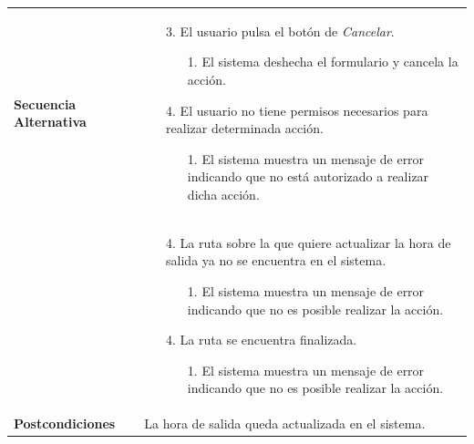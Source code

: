 \begin{longtable}{| p{4cm} | p{10cm} |}
\\
\hline
\textbf{Secuencia Alternativa} &\mbox{}\par\vspace{-\baselineskip}
\begin{enumerate}[leftmargin=0.7cm, topsep=0.1cm]
\item[3.] El usuario pulsa el botón de \textit{Cancelar}.
	\begin{itemize}
	\item[1.] El sistema deshecha el formulario y cancela la acción.
	\end{itemize}
\item[4.] El usuario no tiene permisos necesarios para realizar determinada acción.
	\begin{itemize}
	\item[1.] El sistema muestra un mensaje de error indicando que no está autorizado a realizar dicha acción.
	\end{itemize}
\end{enumerate}
\\ &\mbox{}\par\vspace{-\baselineskip}	
\begin{enumerate}[leftmargin=0.7cm, topsep=0.1cm]
\item[4.] La ruta sobre la que quiere actualizar la hora de salida ya no se encuentra en el sistema.
	\begin{itemize}
	\item[1.] El sistema muestra un mensaje de error indicando que no es posible realizar la acción.
	\end{itemize}
\item[4.] La ruta se encuentra finalizada.
	\begin{itemize}
	\item[1.] El sistema muestra un mensaje de error indicando que no es posible realizar la acción.
	\end{itemize}
\end{enumerate}
\\

\hline
\textbf{Postcondiciones} & 
La hora de salida queda actualizada en el sistema.\\
\hline
\end{longtable}



\newpage
